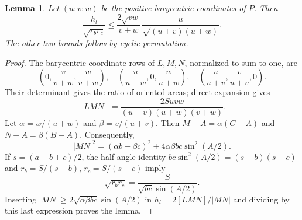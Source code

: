 \documentclass[11pt,a4paper]{article}
\numberwithin{equation}{section}
\newtheorem{lemma}[theorem]{Lemma}
\theoremstyle{definition}
\theoremstyle{remark}
\begin{document}
\begin{lemma}
Let $(u:v:w)$ be the positive barycentric coordinates of $P$. Then
\[
 \frac{h_l}{\sqrt{r_br_c}}\le
 \frac{2\sqrt{vw}}{v+w}\,\frac{u}{\sqrt{(u+v)(u+w)}}.
\]
The other two bounds follow by cyclic permutation.
\end{lemma}

\begin{proof}
The barycentric coordinate rows of $L,M,N$, normalized to sum to one, are
\[
 \left(0,\frac{v}{v+w},\frac{w}{v+w}\right),\quad
 \left(\frac{u}{u+w},0,\frac{w}{u+w}\right),\quad
 \left(\frac{u}{u+v},\frac{v}{u+v},0\right).
\]
Their determinant gives the ratio of oriented areas; direct expansion gives
\[
         [LMN]=\frac{2Suvw}{(u+v)(u+w)(v+w)}.
\]
\noindent
Let $\alpha=w/(u+w)$ and $\beta=v/(u+v)$. Then $M-A=\alpha(C-A)$ and $N-A=\beta(B-A)$. Consequently,
\[
  |MN|^2=(\alpha b-\beta c)^2+4\alpha\beta bc\sin^2(A/2).
\]
If $s=(a+b+c)/2$, the half-angle identity $bc\sin^2(A/2)=(s-b)(s-c)$ and $r_b=S/(s-b)$, $r_c=S/(s-c)$ imply
\[
   \sqrt{r_br_c}=\frac{S}{\sqrt{bc}\sin(A/2)}.
\]
Inserting $|MN|\ge2\sqrt{\alpha\beta bc}\sin(A/2)$ in $h_l=2[LMN]/|MN|$ and dividing by this last expression proves the lemma.
\end{proof}
\end{document}
